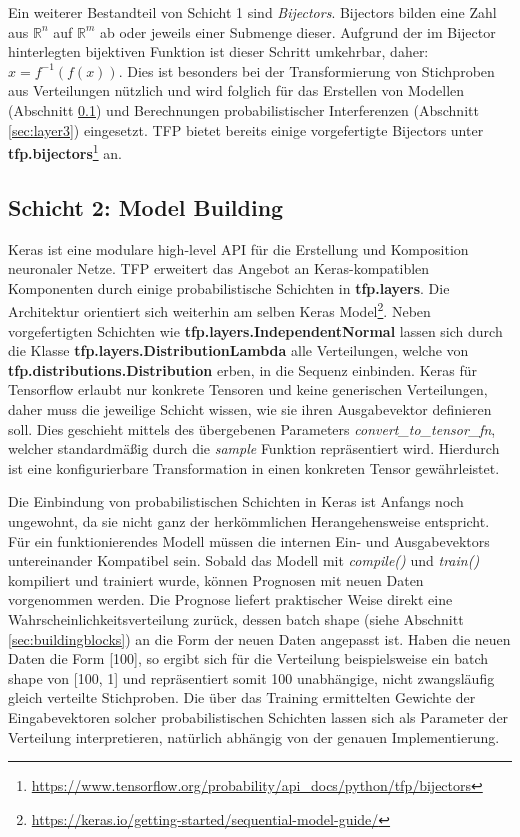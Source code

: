 \documentclass[12pt]{article}
\begin{document}
Ein weiterer Bestandteil von Schicht 1 sind \textit{Bijectors}. Bijectors bilden eine Zahl aus $\mathbb{R}^n$ auf $\mathbb{R}^m$ ab oder jeweils einer Submenge dieser. Aufgrund der im Bijector hinterlegten bijektiven Funktion ist dieser Schritt umkehrbar, daher: $x = f^{-1}(f(x))$. Dies ist besonders bei der Transformierung von Stichproben aus Verteilungen nützlich und wird folglich für das Erstellen von Modellen (Abschnitt \ref{sec:layer2}) und Berechnungen probabilistischer Interferenzen (Abschnitt \ref{sec:layer3}) eingesetzt. TFP bietet bereits einige vorgefertigte Bijectors unter \textbf{tfp.bijectors}\footnote{\url{https://www.tensorflow.org/probability/api_docs/python/tfp/bijectors}} an. 


\subsection{Schicht 2: Model Building}
\label{sec:layer2}

Keras ist eine modulare high-level API für die Erstellung und Komposition neuronaler Netze. TFP erweitert das Angebot an Keras-kompatiblen Komponenten durch einige probabilistische Schichten in \textbf{tfp.layers}. Die Architektur orientiert sich weiterhin am selben Keras Model\footnote{\url{https://keras.io/getting-started/sequential-model-guide/}}. Neben vorgefertigten Schichten wie \textbf{tfp.layers.IndependentNormal} lassen sich durch die Klasse \textbf{tfp.layers.DistributionLambda} alle Verteilungen, welche von \textbf{tfp.distributions.Distribution} erben, in die Sequenz einbinden. Keras für Tensorflow erlaubt nur konkrete Tensoren und keine generischen Verteilungen, daher muss   die jeweilige Schicht wissen, wie sie ihren Ausgabevektor definieren soll. Dies geschieht mittels des übergebenen Parameters \textit{convert\_to\_tensor\_fn}, welcher standardmäßig durch die \textit{sample} Funktion repräsentiert wird. Hierdurch ist eine konfigurierbare Transformation in einen konkreten Tensor gewährleistet.

Die Einbindung von probabilistischen Schichten in Keras ist Anfangs noch ungewohnt, da sie nicht ganz der herkömmlichen Herangehensweise entspricht. Für ein funktionierendes Modell müssen die internen Ein- und Ausgabevektors untereinander Kompatibel sein. Sobald das Modell mit \textit{compile()} und \textit{train()} kompiliert und trainiert wurde, können Prognosen mit neuen Daten vorgenommen werden. Die Prognose liefert praktischer Weise direkt eine Wahrscheinlichkeitsverteilung zurück, dessen batch shape (siehe Abschnitt \ref{sec:buildingblocks}) an die Form der neuen Daten angepasst ist. Haben die neuen Daten die Form [100], so ergibt sich für die Verteilung beispielsweise ein batch shape von [100, 1] und repräsentiert somit 100 unabhängige, nicht zwangsläufig gleich verteilte Stichproben. Die über das Training ermittelten Gewichte der Eingabevektoren solcher probabilistischen Schichten lassen sich als Parameter der Verteilung interpretieren, natürlich abhängig von der genauen Implementierung.
\end{document}
